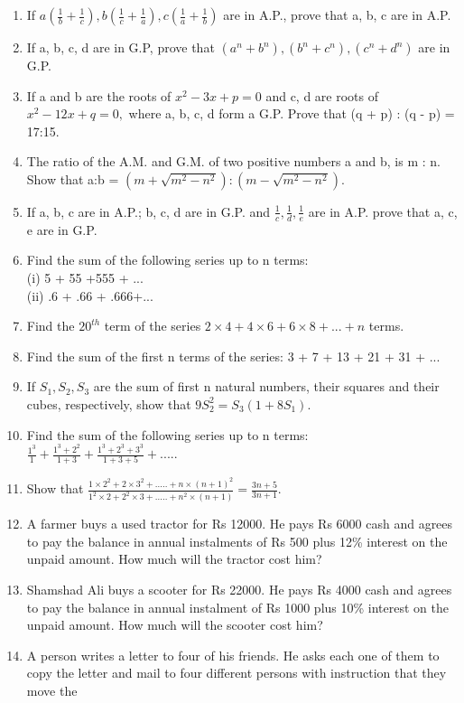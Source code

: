 \begin{enumerate}[label=\arabic*.,ref=\thesubsection.\theenumi]
(q - r )a + (r - p )b + (p - q )c = 0
\item If $a(\frac{1}{b}+\frac{1}{c}), b(\frac{1}{c}+\frac{1}{a}), c(\frac{1}{a}+\frac{1}{b})$ are in A.P., prove that a, b, c are in A.P.
\item If a, b, c, d are in G.P, prove that $(a^n + b^n), (b^n + c^n), (c^n + d^n)$ are in G.P.
\item If a and b are the roots of $x^2 - 3x + p = 0$ and c, d are roots of $x^2 - 12x + q = 0,$ where a, b, c, d form a G.P. Prove that (q + p) : (q - p) = 17:15.
\item The ratio of the A.M. and G.M. of two positive numbers a and b, is m : n. Show that 
a:b = $(m+\sqrt{m^2 - n^2}):(m - \sqrt{m^2 - n^2}).$
\item If a, b, c are in A.P.; b, c, d are in G.P. and $\frac{1}{c}, \frac{1}{d}, \frac{1}{e}$ are in A.P. prove that a, c, e are in G.P.
\item Find the sum of the following series up to n terms:\\
(i) 5 + 55 +555 + ...\\
(ii) .6 + .66 + .666+...
\item Find the $20^{th}$ term of the series $2 \times 4 + 4 \times 6 + 6 \times 8 + ... + n$ terms.
\item Find the sum of the first n terms of the series: 3 + 7 + 13 + 21 + 31 + ...
\item If $S_1, S_2, S_3$ are the sum of first n natural numbers, their squares and their cubes, respectively, show that $9 S_2^2 = S_3 (1 + 8S_1).$
\item Find the sum of the following series up to n terms:
$\frac{1^3}{1}+\frac{1^3+2^2}{1+3}+\frac{1^3+2^3+3^3}{1+3+5}+.....$
\item Show that $\frac{1 \times 2^2+ 2 \times 3^2+.....+n \times (n+1)^2}{1^2 \times 2 + 2^2 \times 3 +.....+n^2 \times (n+1)} = \frac{3n+5}{3n+1}.$
\item A farmer buys a used tractor for Rs 12000. He pays Rs 6000 cash and agrees to pay the balance in annual instalments of Rs 500 plus 12\% interest on the unpaid amount. How much will the tractor cost him?
\item Shamshad Ali buys a scooter for Rs 22000. He pays Rs 4000 cash and agrees to
pay the balance in annual instalment of Rs 1000 plus 10\% interest on the unpaid
amount. How much will the scooter cost him?
\item A person writes a letter to four of his friends. He asks each one of them to copy
the letter and mail to four different persons with instruction that they move the

\end{enumerate}
